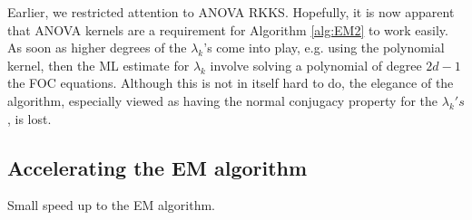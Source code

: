 \begin{remark}
  Earlier, we restricted attention to ANOVA RKKS. 
  Hopefully, it is now apparent that ANOVA kernels are a requirement for Algorithm \ref{alg:EM2} to work easily.
  As soon as higher degrees of the $\lambda_k$'s come into play, e.g. using the polynomial kernel, then the ML estimate for $\lambda_k$ involve solving a polynomial of degree $2d-1$ the FOC equations.
  Although this is not in itself hard to do, the elegance of the algorithm, especially viewed as having the normal conjugacy property for the $\lambda_k's$, is lost.
\end{remark}

\subsection{Accelerating the EM algorithm}

Small speed up to the EM algorithm.

